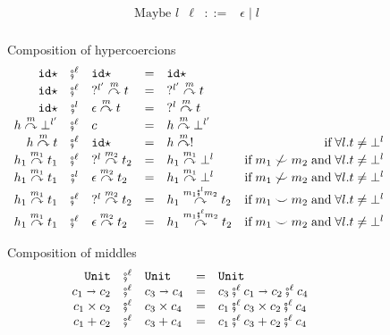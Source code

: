 \documentclass[acmsmall,review,anonymous]{acmart}\settopmatter{printfolios=true,printccs=false,printacmref=false}
\newcommand{\stxrule}[3]{\text{#2} & #1 & ::= & #3\\}
\newcommand{\comprule}[4]{#1 & \fatsemi^\ell & #2 & = & #3 & #4 \\}
\newcommand{\comprulel}[4]{#1 & \fatsemi^l & #2 & = & #3 & #4 \\}
\newcommand{\plus}[0]{+}
\newcommand{\POOunit}[0]{\mathtt{Unit}}
\newcommand{\POOfun}[2]{#1 \shortrightarrow #2}
\newcommand{\POOprod}[2]{#1 \times #2}
\newcommand{\POOsum}[2]{#1 \plus #2}
\newcommand{\sidecond}[1]{\text{if}\;#1}
\newcommand{\hyperCoercionI}[0]{\mathtt{id\star}}
\newcommand{\hyperCoercionC}[3]{#1 \overset{#2}{\curvearrowright} #3}
\begin{document}
\begin{figure}
  \[
  \begin{array}{lrcl}
  \stxrule{\ell}{Maybe $l$}{\epsilon \mid l}
  \end{array}
  \]
  
  Composition of hypercoercions 
  \[ 
  \begin{array}{rclclr}
  
  \comprule{
    \hyperCoercionI
  }{
    \hyperCoercionI
  }{
    \hyperCoercionI
  }{}
  
  \comprule{
    \hyperCoercionI
  }{
    \hyperCoercionC{?^{l'}}{m}{t}
  }{
    \hyperCoercionC{?^{l'}}{m}{t}
  }{}
  
  \comprulel{
    \hyperCoercionI
  }{
    \hyperCoercionC{\epsilon}{m}{t}
  }{
    \hyperCoercionC{?^{l}}{m}{t}
  }{}
  
  \comprule{
    \hyperCoercionC{h}{m}{\bot^{l'}}
  }{
    c
  }{
    \hyperCoercionC{h}{m}{\bot^{l'}}
  }{}
  
  \comprule{
    \hyperCoercionC{h}{m}{t}
  }{
    \hyperCoercionI
  }{
    \hyperCoercionC{h}{m}{!}
  }{
    \sidecond{\forall l. t \neq \bot^{l}}
  }
  
  \comprule{
    \hyperCoercionC{h_1}{m_1}{t_1}
  }{
    \hyperCoercionC{?^l}{m_2}{t_2}
  }{
    \hyperCoercionC{h_1}{m_1}{\bot^l}
  }{
    \sidecond{
       m_1 \not\smile m_2
      \; \text{and} \;
      \forall l. t \neq \bot^{l}
    }
  }

\comprulel{
\hyperCoercionC{h_1}{m_1}{t_1}
}{
\hyperCoercionC{\epsilon}{m_2}{t_2}
}{
\hyperCoercionC{h_1}{m_1}{\bot^l}
}{
\sidecond{
  m_1 \not\smile m_2
  \; \text{and} \;
  \forall l. t \neq \bot^{l}
}
}
\comprule{
\hyperCoercionC{h_1}{m_1}{t_1}
}{
\hyperCoercionC{?^l}{m_2}{t_2}
}{
\hyperCoercionC{h_1}{m_1 \fatsemi^{l} m_2}{t_2}
}{
\sidecond{
  m_1 \smile m_2
  \; \text{and} \;
  \forall l. t \neq \bot^{l}
}
}
  \comprule{
    \hyperCoercionC{h_1}{m_1}{t_1}
  }{
    \hyperCoercionC{\epsilon}{m_2}{t_2}
  }{
    \hyperCoercionC{h_1}{m_1 \fatsemi^{\ell} m_2}{t_2}
  }{
    \sidecond{
      m_1 \smile m_2
      \; \text{and} \;
      \forall l. t \neq \bot^{l}
    }
  }
  \end{array}
  \]
  
  Composition of middles 
  \[ 
  \begin{array}{rclclr}
  \comprule{\POOunit}{\POOunit}{
    \POOunit
  }{}
  \comprule{\POOfun{c_1}{c_2}}{\POOfun{c_3}{c_4}}{
    \POOfun{c_3 \fatsemi^{\ell} c_1}{c_2 \fatsemi^\ell c_4}
  }{}
  \comprule{\POOprod{c_1}{c_2}}{\POOprod{c_3}{c_4}}{
    \POOprod{c_1 \fatsemi^\ell c_3}{c_2 \fatsemi^\ell c_4}
  }{}
  \comprule{\POOsum{c_1}{c_2}}{\POOsum{c_3}{c_4}}{
    \POOsum{c_1 \fatsemi^\ell c_3}{c_2 \fatsemi^\ell c_4}
  }{}
  \end{array}
  \]
  

\end{figure}
\end{document}
